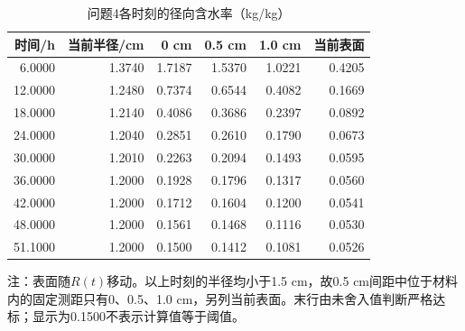 \begin{table}[htbp]\centering\small
\caption{问题4各时刻的径向含水率（kg/kg）}\label{tab:q4_output}
\begin{tabular}{rrrrrr}\toprule
时间/h & 当前半径/cm & 0 cm & 0.5 cm & 1.0 cm & 当前表面\\\midrule
6.0000 & 1.3740 & 1.7187 & 1.5370 & 1.0221 & 0.4205\\
12.0000 & 1.2480 & 0.7374 & 0.6544 & 0.4082 & 0.1669\\
18.0000 & 1.2140 & 0.4086 & 0.3686 & 0.2397 & 0.0892\\
24.0000 & 1.2040 & 0.2851 & 0.2610 & 0.1790 & 0.0673\\
30.0000 & 1.2010 & 0.2263 & 0.2094 & 0.1493 & 0.0595\\
36.0000 & 1.2000 & 0.1928 & 0.1796 & 0.1317 & 0.0560\\
42.0000 & 1.2000 & 0.1712 & 0.1604 & 0.1200 & 0.0541\\
48.0000 & 1.2000 & 0.1561 & 0.1468 & 0.1116 & 0.0530\\
51.1000 & 1.2000 & 0.1500 & 0.1412 & 0.1081 & 0.0526\\
\bottomrule\end{tabular}
\par\smallskip\parbox{.94\textwidth}{\footnotesize 注：表面随$R(t)$移动。以上时刻的半径均小于1.5 cm，故0.5 cm间距中位于材料内的固定测距只有0、0.5、1.0 cm，另列当前表面。末行由未舍入值判断严格达标；显示为0.1500不表示计算值等于阈值。}
\end{table}
